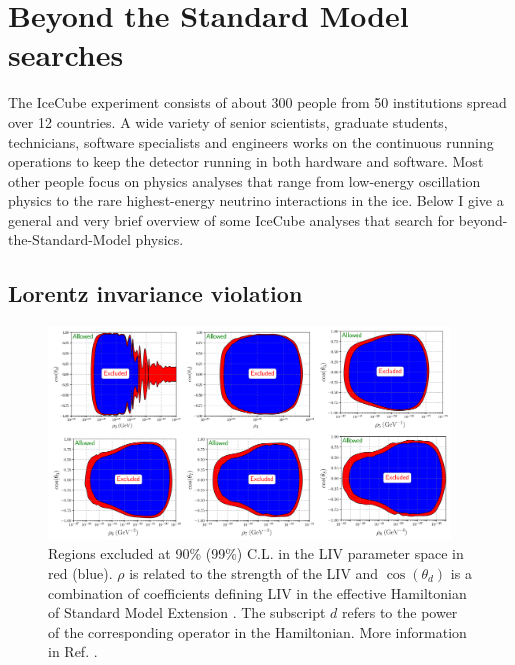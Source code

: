 \section{Beyond the Standard Model searches}
The IceCube experiment consists of about 300 people from 50 institutions spread over 12 countries. A wide variety of senior scientists, graduate students, technicians, software specialists and engineers works on the continuous running operations to keep the detector running in both hardware and software. Most other people focus on physics analyses that range from low-energy oscillation physics to the rare highest-energy neutrino interactions in the ice. Below I give a general and very brief overview of some IceCube analyses that search for beyond-the-Standard-Model physics.

\subsection{Lorentz invariance violation}
\begin{figure}[t]
\centering
\includegraphics[width=0.95\textwidth]{chapter5/img/LV.png}
\caption{Regions excluded at 90\% (99\%) C.L. in the LIV parameter space in red (blue). $\rho$ is related to the strength of the LIV and $\cos \left(\theta_d\right)$ is a combination of coefficients defining LIV in the effective Hamiltonian of Standard Model Extension \cite{Colladay:1998fq}. The subscript $d$ refers to the power of the corresponding operator in the Hamiltonian. More information in Ref. \cite{Aartsen:2017ibm}.}
\label{fig:lv}
\end{figure}

